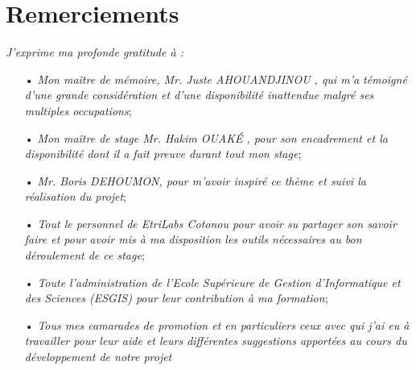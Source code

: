\chapter{Remerciements}
\textit{J’exprime ma profonde gratitude à :}
\begin{itemize}
\item[•]\textit{Mon maître de mémoire, Mr. Juste AHOUANDJINOU , qui m’a témoigné d’une grande considération et d’une disponibilité inattendue malgré ses multiples occupations};
\item[•]\textit{Mon maître de stage Mr. Hakim OUAKÉ , pour son encadrement et la disponibilité dont il a fait preuve durant tout mon stage};
\item[•]\textit{Mr. Boris DEHOUMON, pour m’avoir inspiré ce thème et suivi la réalisation du projet};
\item[•]\textit{Tout le personnel de EtriLabs Cotonou pour avoir su partager son savoir faire et pour avoir mis à ma disposition les outils nécessaires au bon déroulement de ce stage};
\item[•]\textit{Toute l’administration de l'Ecole Supérieure de Gestion d'Informatique et des Sciences (ESGIS) pour leur contribution à ma formation};
\item[•]\textit{Tous mes camarades de promotion et en particuliers ceux avec qui j’ai eu à travailler pour leur aide et leurs différentes suggestions apportées au cours du développement de notre projet}
\end{itemize}
 